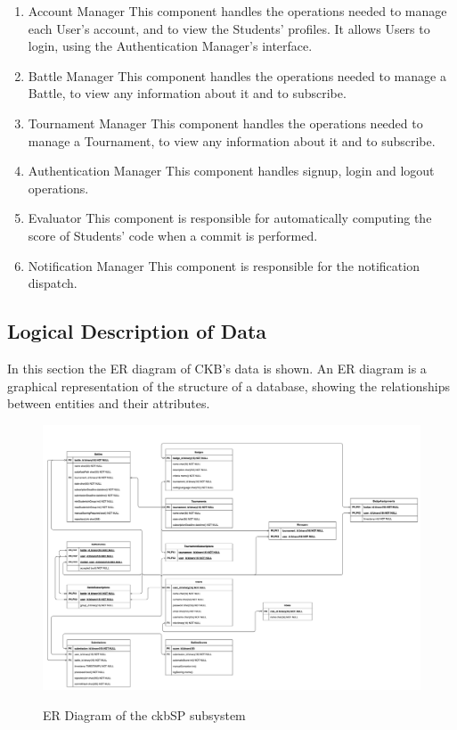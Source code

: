 \documentclass{Configuration_Files/Template}
\begin{document}
\begin{enumerate}
  \item \textcolor{bluepoli}{Account Manager} This component handles the operations needed to manage each User's account, and to view the Students' profiles. It allows Users to login, using the Authentication Manager's interface.
    \item \textcolor{bluepoli}{Battle Manager} This component handles the operations needed to manage a Battle, to view any information about it and to subscribe.
    \item \textcolor{bluepoli}{Tournament Manager} This component handles the operations needed to manage a Tournament, to view any information about it and to subscribe.
    \item \textcolor{bluepoli}{Authentication Manager} This component handles signup, login and logout operations.
    \item \textcolor{bluepoli}{Evaluator} This component is responsible for automatically computing the score of Students' code when a commit is performed. 
    \item \textcolor{bluepoli}{Notification Manager} This component is responsible for the notification dispatch.
\end{enumerate}

\subsection{Logical Description of Data}

In this section the ER diagram of CKB's data is shown. An ER diagram is a graphical representation of the structure of a database, showing the relationships between entities and their attributes.

\begin{figure}[H]
\centering
\includegraphics[scale = 0.3]{DD_latex/Images/diagrams/ER_Diagram.png}\\
\caption{ER Diagram of the ckbSP subsystem}
\end{figure}
\end{document}
